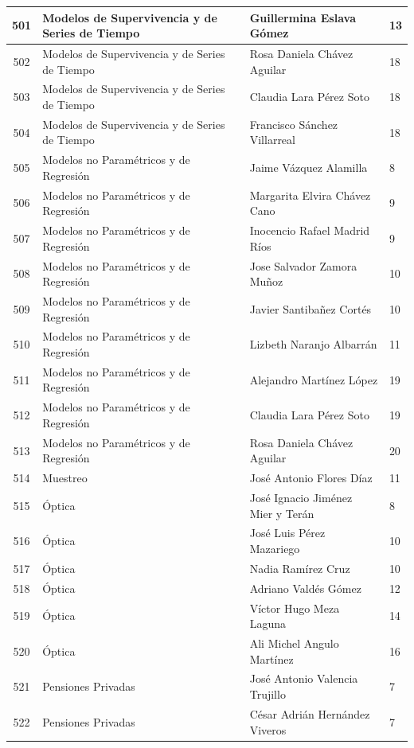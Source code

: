 {\begin{longtable}{|c|p{6.5cm}|p{5cm}|p{1.5cm}|}
  501 & Modelos de Supervivencia y de Series de Tiempo & Guillermina Eslava Gómez & 13 \\ \hline
  502 & Modelos de Supervivencia y de Series de Tiempo & Rosa Daniela Chávez Aguilar & 18 \\ \hline
  503 & Modelos de Supervivencia y de Series de Tiempo & Claudia Lara Pérez Soto & 18 \\ \hline
  504 & Modelos de Supervivencia y de Series de Tiempo & Francisco Sánchez Villarreal & 18 \\ \hline
  505 & Modelos no Paramétricos y de Regresión & Jaime Vázquez Alamilla & 8 \\ \hline
  506 & Modelos no Paramétricos y de Regresión & Margarita Elvira Chávez Cano & 9 \\ \hline
  507 & Modelos no Paramétricos y de Regresión & Inocencio Rafael Madrid Ríos & 9 \\ \hline
  508 & Modelos no Paramétricos y de Regresión & Jose Salvador Zamora Muñoz & 10 \\ \hline
  509 & Modelos no Paramétricos y de Regresión & Javier Santibañez Cortés & 10 \\ \hline
  510 & Modelos no Paramétricos y de Regresión & Lizbeth Naranjo Albarrán & 11 \\ \hline
  511 & Modelos no Paramétricos y de Regresión & Alejandro Martínez López & 19 \\ \hline
  512 & Modelos no Paramétricos y de Regresión & Claudia Lara Pérez Soto & 19 \\ \hline
  513 & Modelos no Paramétricos y de Regresión & Rosa Daniela Chávez Aguilar & 20 \\ \hline
  514 & Muestreo & José Antonio Flores Díaz & 11 \\ \hline
  515 & Óptica & José Ignacio Jiménez Mier y Terán & 8 \\ \hline
  516 & Óptica & José Luis Pérez Mazariego & 10 \\ \hline
  517 & Óptica & Nadia Ramírez Cruz & 10 \\ \hline
  518 & Óptica & Adriano Valdés Gómez & 12 \\ \hline
  519 & Óptica & Víctor Hugo Meza Laguna & 14 \\ \hline
  520 & Óptica & Ali Michel Angulo Martínez & 16 \\ \hline
  521 & Pensiones Privadas & José Antonio Valencia Trujillo & 7 \\ \hline
  522 & Pensiones Privadas & César Adrián Hernández Viveros & 7 \\ \hline

\end{longtable}}
